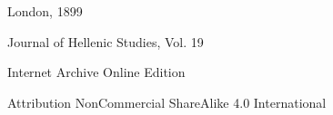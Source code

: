 \documentclass[a4paper, 11pt, oneside, polutonikogreek, english]{article}
\begin{document}
\begin{titlepage}
	\vspace*{\fill}%
	
	
	{London, 1899} %
 
        {\small Journal of Hellenic Studies, Vol. 19}

	\vspace{1\baselineskip} %

        Internet Archive Online Edition  %
	
	{\small Attribution NonCommercial ShareAlike 4.0 International } %
\end{titlepage}
\clearpage
\Large
\setlength{\parskip}{1mm plus1mm minus1mm}
\tableofcontents
\clearpage
\section*{}
\end{document}
